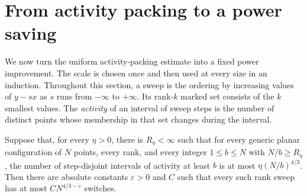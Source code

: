 \section{From activity packing to a power saving}
\label{sec:recurrence}

We now turn the uniform activity-packing estimate into a fixed power
improvement. The scale is chosen once and then used at every size in
an induction. Throughout this section, a sweep is the ordering by
increasing values of $y-sx$ as $s$ runs from $-\infty$ to $+\infty$.
Its rank-$k$ marked set consists of the $k$ smallest values. The
\emph{activity} of an interval of sweep steps is the number of distinct
points whose membership in that set changes during the interval.

\begin{proposition}\label{prop:packing-to-power}
Suppose that, for every $\eta>0$, there is $R_\eta<\infty$ such that
for every generic planar configuration of $N$ points, every rank, and
every integer $1\le b\le N$ with $N/b\ge R_\eta$, the number of
step-disjoint intervals of activity at least $b$ is at most
$\eta(N/b)^{4/3}$. Then there are absolute constants $\varepsilon>0$
and $C$ such that every such rank sweep has at most
$CN^{4/3-\varepsilon}$ switches.
\end{proposition}

